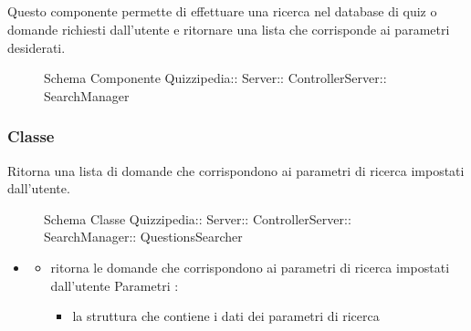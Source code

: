 \subsection{}
Questo componente permette di effettuare una ricerca nel database di quiz o domande richiesti dall'utente e ritornare una lista che corrisponde ai parametri desiderati.
\begin{figure}[H]
\centering
\noindent{}
\caption[Schema Componente SearchManager]{Schema Componente Quizzipedia:: Server:: ControllerServer:: SearchManager}
\end{figure}
\subsubsection{Classe }
Ritorna una lista di domande che corrispondono ai parametri di ricerca impostati dall'utente.
\begin{figure}[H]
\centering
\noindent{}
\caption[Schema Classe QuestionsSearcher]{Schema Classe Quizzipedia:: Server:: ControllerServer:: SearchManager:: QuestionsSearcher}
\end{figure}
\begin{itemize}
\item {}
\begin{itemize}
\item {}
\newline
ritorna le domande che corrispondono ai parametri di ricerca impostati dall'utente
\newline
Parametri :
\begin{itemize}
\item {}
\newline
la struttura che contiene i dati dei parametri di ricerca
\end{itemize}
\end{itemize}
\end{itemize}
